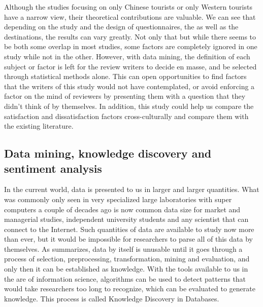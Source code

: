 \documentclass[review]{elsarticle}
\begin{document}
Although the studies focusing on only Chinese tourists or only Western tourists have a narrow view, their theoretical contributions are valuable. We can see that depending on the study and the design of questionnaires, the as well as the destinations, the results can vary greatly. Not only that but while there seems to be both some overlap in most studies, some factors are completely ignored in one study while not in the other.  However, with data mining, the definition of each subject or factor is left for the review writers to decide en masse, and be selected through statistical methods alone. This can open opportunities to find factors that the writers of this study would not have contemplated, or avoid enforcing a factor on the mind of reviewers by presenting them with a question that they didn't think of by themselves. In addition, this study could help us compare the satisfaction and dissatisfaction factors cross-culturally and compare them with the existing literature.

\subsection{Data mining, knowledge discovery and sentiment analysis}\label{theory_data}

In the current world, data is presented to us in larger and larger quantities. What was commonly only seen in very specialized large laboratories with super computers a couple of decades ago is now common data size for market and managerial studies, independent university students and any scientist that can connect to the Internet. Such quantities of data are available to study now more than ever, but it would be impossible for researchers to parse all of this data by themselves. As \cite{fayyad1996data} summarizes, data by itself is unusable until it goes through a process of selection, preprocessing, transformation, mining and evaluation, and only then it can be established as knowledge. With the tools available to us in the are of information science, algorithms can be used to detect patterns that would take researchers too long to recognize, which can be evaluated to generate knowledge. This process is called Knowledge Discovery in Databases. 
\end{document}
